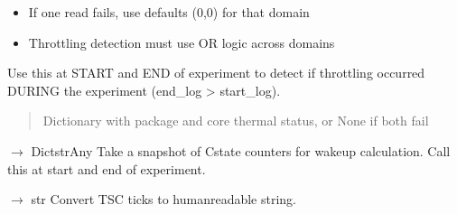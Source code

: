 \documentclass[letterpaper,10pt,english]{sphinxmanual}
\begin{document}
\begin{fulllineitems}
\begin{fulllineitems}
\begin{description}
\begin{itemize}
\item {} 
\sphinxAtStartPar
If one read fails, use defaults (0,0) for that domain

\item {} 
\sphinxAtStartPar
Throttling detection must use OR logic across domains

\end{itemize}

\end{description}

\sphinxAtStartPar
Use this at START and END of experiment to detect if throttling
occurred DURING the experiment (end\_log \textgreater{} start\_log).
\begin{quote}\begin{description}
\sphinxAtStartPar
Dictionary with package and core thermal status, or None if both fail

\end{description}\end{quote}

\end{fulllineitems}


\begin{fulllineitems}
\label{\detokenize{core.readers.msr_reader:core.readers.msr_reader.MSRReader.take_cstate_snapshot}}
\pysigstartsignatures
\pysiglinewithargsret
{}
{}
{{ $\rightarrow$ Dict\DUrole{p}{{[}}strAny\DUrole{p}{{]}}}}
\pysigstopsignatures
\sphinxAtStartPar
Take a snapshot of C\sphinxhyphen{}state counters for wakeup calculation.
Call this at start and end of experiment.

\end{fulllineitems}


\begin{fulllineitems}
\label{\detokenize{core.readers.msr_reader:core.readers.msr_reader.MSRReader.ticks_to_human}}
\pysigstartsignatures
\pysiglinewithargsret
{}
{}
{{ $\rightarrow$ str}}
\pysigstopsignatures
\sphinxAtStartPar
Convert TSC ticks to human\sphinxhyphen{}readable string.


\end{fulllineitems}
\end{fulllineitems}
\end{document}
